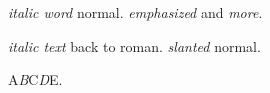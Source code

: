 \documentclass{article}
\begin{document}
\textit{italic word} normal.
\emph{emphasized} and \emph{more}.

{\it italic text\/} back to roman.
{\sl slanted\/} normal.

A{\it B\/}C{\it D\/}E.
\end{document}
